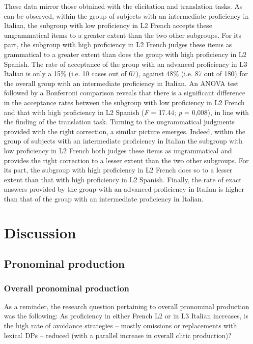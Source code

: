 \documentclass[output=paper,modfonts,nonflat,newtxmath]{langsci/langscibook}
\begin{document}
These data mirror those obtained with the elicitation and translation tasks. As can be observed, within the group of subjects with an intermediate proficiency in Italian, the subgroup with low proficiency in L2 French accepts these ungrammatical items to a greater extent than the two other subgroups. For its part, the subgroup with high proficiency in L2 French judges these items as grammatical to a greater extent than does the group with high proficiency in L2 Spanish. The rate of acceptance of the group with an advanced proficiency in L3 Italian is only a 15\% (i.e. 10 cases out of 67), against 48\% (i.e. 87 out of 180) for the overall group with an intermediate proficiency in Italian. An ANOVA test followed by a Bonferroni comparison reveals that there is a significant difference in the acceptance rates between the subgroup with low proficiency in L2 French and that with high proficiency in L2 Spanish (\textit{F} = 17.44; \textit{p} = 0,008), in line with the finding of the translation task. Turning to the ungrammatical judgments provided with the right correction, a similar picture emerges. Indeed, within the group of subjects with an intermediate proficiency in Italian the subgroup with low proficiency in L2 French both judges these items as ungrammatical and provides the right correction to a lesser extent than the two other subgroups. For its part, the subgroup with high proficiency in L2 French does so to a lesser extent than that with high proficiency in L2 Spanish. Finally, the rate of exact answers provided by the group with an advanced proficiency in Italian is higher than that of the group with an intermediate proficiency in Italian.

\section{Discussion} %
\label{sec:sciutti:5}

\subsection{Pronominal production} %
\label{sec:sciutti:5.1}

\subsubsection{Overall {pronominal} production} %

As a reminder, the research question pertaining to overall pronominal production was the following: As proficiency in either French L2 or in L3 Italian increases, is the high rate of avoidance strategies – mostly omissions or replacements with lexical DPs – reduced (with a parallel increase in overall clitic production)?
\end{document}
